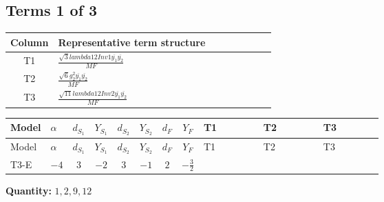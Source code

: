 \documentclass[8pt]{article}
\begin{document}
\begin{landscape}
\subsection*{Terms 1 of 3}
\begin{center}
\begin{tabular}{@{}c >{\raggedright\arraybackslash}p{0.82\linewidth}@{}}
\toprule
Column & Representative term structure \\
\midrule
T1 & \(\displaystyle \frac{\sqrt{3} lambda12Inv1 \overline{y_{1}} \overline{y_{2}}}{MF}\) \\
\midrule
T2 & \(\displaystyle \frac{\sqrt{6} g_{2}^{2} \overline{y_{1}} \overline{y_{2}}}{MF}\) \\
\midrule
T3 & \(\displaystyle \frac{\sqrt{11} lambda12Inv2 \overline{y_{1}} \overline{y_{2}}}{MF}\) \\
\midrule
\bottomrule
\end{tabular}
\end{center}
\smallskip
\tiny
\begin{longtable}{@{}llcccccc >{\raggedright\arraybackslash}p{0.21\linewidth} >{\raggedright\arraybackslash}p{0.21\linewidth} >{\raggedright\arraybackslash}p{0.21\linewidth}@{}}
\toprule
Model & $\alpha$ & $d_{S_1}$ & $Y_{S_1}$ & $d_{S_2}$ & $Y_{S_2}$ & $d_F$ & $Y_F$ & T1 & T2 & T3 \\
\midrule
\endfirsthead
\toprule
Model & $\alpha$ & $d_{S_1}$ & $Y_{S_1}$ & $d_{S_2}$ & $Y_{S_2}$ & $d_F$ & $Y_F$ & T1 & T2 & T3 \\
\midrule
\endhead
T3-E & $-4$ & $3$ & $-2$ & $3$ & $-1$ & $2$ & $-\frac{3}{2}$ & \scriptsize\adjustbox{max width=\linewidth}{$\begin{gathered} - \frac{\sqrt{3} lambda12Inv1 \overline{y_{1}} \overline{y_{2}}}{6 MF}\end{gathered}$} & \scriptsize\adjustbox{max width=\linewidth}{$\begin{gathered} \frac{\sqrt{6} g_{2}^{2} \overline{y_{1}} \overline{y_{2}}}{6 MF}\end{gathered}$} & \scriptsize\adjustbox{max width=\linewidth}{$\begin{gathered} \frac{3 \sqrt{11} lambda12Inv2 \overline{y_{1}} \overline{y_{2}}}{22 MF}\end{gathered}$} \\
\midrule
\bottomrule
\end{longtable}
\clearpage
\noindent\textbf{Quantity: }$\mathrm{1,2,9,12}$\par\smallskip

\end{landscape}
\end{document}
